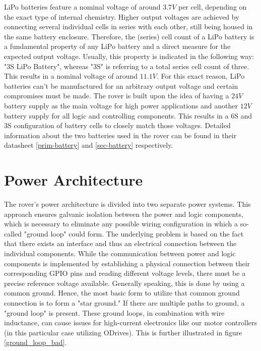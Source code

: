     LiPo batteries feature a nominal voltage of around $3.7V$ per cell, depending on the exact type of internal chemistry. Higher output voltages are achieved by connecting several individual cells in series with each other, still being housed in the same battery enclosure. Therefore, the (series) cell count of a LiPo battery is a fundamental property of any LiPo battery and a direct measure for the expected output voltage. Usually, this property is indicated in the following way: "3S LiPo Battery", whereas "3S" is referring to a total series cell count of three. This results in a nominal voltage of around $11.1V$. For this exact reason, LiPo batteries can't be manufactured for an arbitrary output voltage and certain compromises must be made. The rover is built upon the idea of having a $24V$ battery supply as the main voltage for high power applications and another $12V$ battery supply for all logic and controlling components. This results in a 6S and 3S configuration of battery cells to closely match those voltages. Detailed information about the two batteries used in the rover can be found in their datasheet \ref{prim-battery} and \ref{sec-battery} respectively.

    \clearpage      
    
\section{Power Architecture}

    The rover's power architecture is divided into two separate power systems. This approach ensures galvanic isolation between the power and logic components, which is necessary to eliminate any possible wiring configuration in which a so-called "ground loop" could form. The underlying problem is based on the fact that there exists an interface and thus an electrical connection between the individual components. While the communication between power and logic components is implemented by establishing a physical connection between their corresponding GPIO pins and reading different voltage levels, there must be a precise reference voltage available. Generally speaking, this is done by using a common ground. Hence, the most basic form to utilize that common ground connection is to form a "star ground." If there are multiple paths to ground, a "ground loop" is present. These ground loops, in combination with wire inductance, can cause issues for high-current electronics like our motor controllers (in this particular case utilizing ODrives). This is further illustrated in figure \ref{ground_loop_bad}.
    

